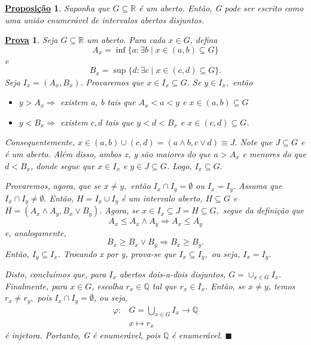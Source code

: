 \documentclass{article}
\newtheorem*{prop*}{\underline{Proposi\c c\~ao}}
\newtheorem*{proof*}{\underline{Prova}}
\renewcommand\qedsymbol{$\blacksquare$}
\begin{document}
\begin{prop*}
	Suponha que \(G\subseteq \mathbb{R}\) é um aberto. Então, G pode ser escrito como uma união enumerável de intervalos abertos disjuntos.
\end{prop*}
\begin{proof*}
	Seja \(G\subseteq \mathbb{R}\) um aberto. Para cada \(x\in G\), defina
	\[
		A_{x} = \inf_{}\{a: \exists b\mid x\in (a, b)\subseteq G\}
	\]
	e
	\[
		B_{x} = \sup_{}\{d: \exists c\mid x\in (c, d)\subseteq G\}.
	\]
	Seja \(I_{x} = (A_{x}, B_{x}).\) Provaremos que \(x\in I_{x}\subseteq G\). Se \(y\in I_{x},\) então
	\begin{itemize}
		\item \(y > A_{x} \Rightarrow \) existem a, b tais que \(A_{x} < a < y\) e \(x\in (a, b)\subseteq G\)
		\item \(y < B_{x} \Rightarrow \) existem \(c, d\) tais que \(y < d < B_{x}\) e \(x\in (c, d)\subseteq G\).
	\end{itemize}
	Consequentemente, \(x\in (a, b)\cup (c, d) = (a\wedge b, c\vee d)\equiv J.\) Note que \(J\subseteq G\) e é um aberto. Além disso, ambos x, y são maiores
	do que \(a > A_{x}\) e menores do que \(d < B_{x}\), donde segue que \(x\in I_{x}\) e \(y\in J\subseteq G\). Logo, \(I_{x}\subseteq G.\)

	Provaremos, agora, que se \(x\neq y,\) então \(I_{x}\cap I_{y} = \emptyset \) ou \(I_{x} = I_{y}.\) Assuma que \(I_{x}\cap I_{y}\neq\emptyset.\) Então,
	\(H = I_{x}\cup I_{y}\) é um intervalo aberto, \(H \subseteq G\) e \(H = (A_{x}\wedge A_{y}, B_{x}\vee B_{y}).\) Agora, se \(x\in I_{x}\subseteq J = H \subseteq G,\) segue da definição que
	\[
		A_{x} \leq A_{x}\wedge A_{y} \Rightarrow A_{x} \leq A_{y}
	\]
	e, analogamente,
	\[
		B_{x} \geq B_{x}\vee B_{y}\Rightarrow B_{x}\geq B_{y}.
	\]
	Então, \(I_{y}\subseteq I_x\). Trocando x por y, prova-se que \(I_x \subseteq I_y,\) ou seja, \(I_{x} = I_{y}\).

	Disto, concluímos que, para \(I_{x}\) abertos dois-a-dois disjuntos, \(G = \cup_{x\in G}I_{x}.\) Finalmente, para \(x\in G\), escolha \(r_{x}\in \mathbb{Q}\) tal que \(r_{x}\in I_x\). Então,
	se \(x\neq y\), temos \(r_{x}\neq r_y,\) pois \(I_{x}\cap I_{y} = \emptyset \), ou seja,
	\begin{align*}
		\varphi : & G = \bigcup_{x\in G}^{}I_{x}\rightarrow \mathbb{Q} \\
		          & x \mapsto r_{x}
	\end{align*}
	é injetora. Portanto, G é enumerável, pois \(\mathbb{Q}\) é enumerável. \qedsymbol
\end{proof*}
\end{document}
